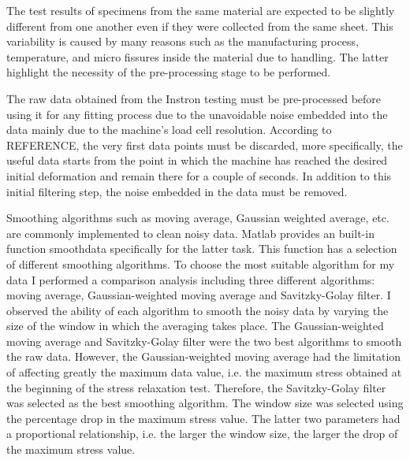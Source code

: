 The test results of specimens from the same material are expected to be slightly different from one another even if they were collected from the same sheet. This variability is caused by many reasons such as the manufacturing process, temperature, and micro fissures inside the material due to handling. The latter highlight the necessity of the pre-processing stage to be performed.

The raw data obtained from the Instron testing must be pre-processed before using it for any fitting process due to the unavoidable noise embedded into the data mainly due to the machine's load cell resolution. According to REFERENCE, the very first data points must be discarded, more specifically, the useful data starts from the point in which the machine has reached the desired initial deformation and remain there for a couple of seconds. In addition to this initial filtering step, the noise embedded in the data must be removed. 

Smoothing algorithms such as moving average, Gaussian weighted average, etc. are commonly implemented to clean noisy data. Matlab provides an built-in function smoothdata specifically for the latter task. This function has a selection of different smoothing algorithms. To choose the most suitable algorithm for my data I performed a comparison analysis including three different algorithms: moving average, Gaussian-weighted moving average and Savitzky-Golay filter. I observed the ability of each algorithm to smooth the noisy data by varying the size of the window in which the averaging takes place. The Gaussian-weighted moving average and Savitzky-Golay filter were the two best algorithms to smooth the raw data. However, the Gaussian-weighted moving average had the limitation of affecting greatly the maximum data value, i.e. the maximum stress obtained at the beginning of the stress relaxation test. Therefore, the Savitzky-Golay filter was selected as the best smoothing algorithm. The window size was selected using the percentage drop in the maximum stress value. The latter two parameters had a proportional relationship, i.e. the larger the window size, the larger the drop of the maximum stress value.



